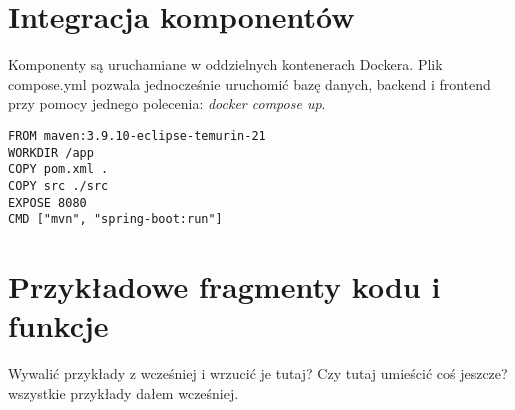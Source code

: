 \section{Integracja komponentów}
Komponenty są uruchamiane w oddzielnych kontenerach Dockera. Plik compose.yml pozwala jednocześnie uruchomić bazę danych, backend i frontend przy pomocy jednego polecenia: \textit{docker compose up}.
\begin{lstlisting}[caption={Budowanie obrazu - Dockerfile}, label={lst:Docker-build}]
FROM maven:3.9.10-eclipse-temurin-21
WORKDIR /app
COPY pom.xml .
COPY src ./src
EXPOSE 8080
CMD ["mvn", "spring-boot:run"]
\end{lstlisting}
\section{Przykładowe fragmenty kodu i funkcje}
Wywalić przykłady z wcześniej i wrzucić je tutaj? Czy tutaj umieścić coś jeszcze? wszystkie przykłady dałem wcześniej.
